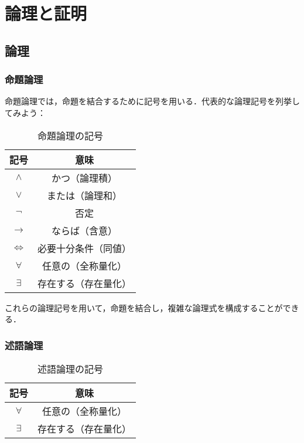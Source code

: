 \documentclass[a4paper,11pt]{ltjsarticle}
\begin{document}
\newpage 

\section{論理と証明}
\subsection{論理}
\subsubsection{命題論理}

	命題論理では，命題を結合するために記号を用いる．代表的な論理記号を列挙してみよう：

	\begin{table}[ht]
		\centering
		\caption{命題論理の記号}
		\begin{tabular}{c|c}
		\hline
		記号 & 意味 \\
		\hline
    $\land$ & かつ（論理積\index{ろんりせき@論理積}） \\
    $\lor$ & または（論理和\index{ろんりわ@論理和}） \\
    $\lnot$ & 否定\index{ひてい@否定} \\
    $\to$ & ならば（含意\index{がんい@含意}） \\
    $\Leftrightarrow$ & 必要十分条件（同値）\index{どうち@同値} \\
    $\forall$ & 任意の（全称量化\index{ぜんしょうりょうか@全称量化}） \\
    $\exists$ & 存在する（存在量化\index{そんざいりょうか@存在量化}） \\
		\hline
		\end{tabular}
		\end{table}

    これらの論理記号を用いて，命題を結合し，複雑な論理式を構成することができる．

    \subsubsection{述語論理}

    \begin{table}[ht] 
      \centering 
      \caption{述語論理の記号} 
      \begin{tabular}{c|c} 
        \hline 
        記号 & 意味 \\
         \hline 
         $\forall$ & 任意の（全称量化\index{ぜんしょうりょうか@全称量化}）\\
        $\exists$ & 存在する（存在量化\index{そんざいりょうか@存在量化}） \\
        \hline 
      \end{tabular} 
      \end{table}
    
\end{document}
